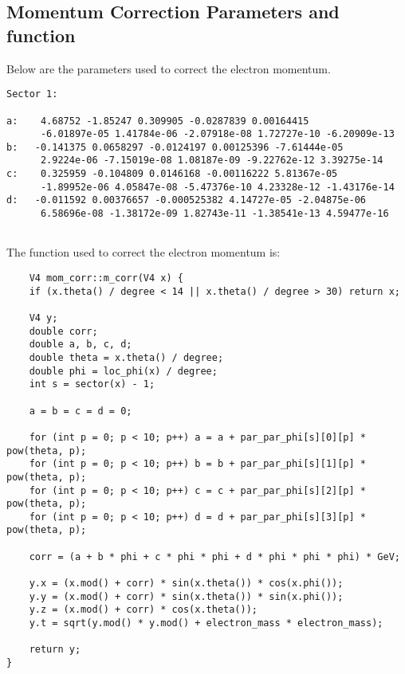 \subsection{Momentum Correction Parameters and function}\label{app:mom_corr_pars}

Below are the parameters used to correct the electron momentum.

\begin{verbatim}
Sector 1:

a:    4.68752 -1.85247 0.309905 -0.0287839 0.00164415
      -6.01897e-05 1.41784e-06 -2.07918e-08 1.72727e-10 -6.20909e-13
b:   -0.141375 0.0658297 -0.0124197 0.00125396 -7.61444e-05
      2.9224e-06 -7.15019e-08 1.08187e-09 -9.22762e-12 3.39275e-14
c:    0.325959 -0.104809 0.0146168 -0.00116222 5.81367e-05
      -1.89952e-06 4.05847e-08 -5.47376e-10 4.23328e-12 -1.43176e-14
d:   -0.011592 0.00376657 -0.000525382 4.14727e-05 -2.04875e-06
      6.58696e-08 -1.38172e-09 1.82743e-11 -1.38541e-13 4.59477e-16


\end{verbatim}


The function used to correct the electron momentum is:

\begin{verbatim}
    V4 mom_corr::m_corr(V4 x) {
    if (x.theta() / degree < 14 || x.theta() / degree > 30) return x;

    V4 y;
    double corr;
    double a, b, c, d;
    double theta = x.theta() / degree;
    double phi = loc_phi(x) / degree;
    int s = sector(x) - 1;

    a = b = c = d = 0;

    for (int p = 0; p < 10; p++) a = a + par_par_phi[s][0][p] * pow(theta, p);
    for (int p = 0; p < 10; p++) b = b + par_par_phi[s][1][p] * pow(theta, p);
    for (int p = 0; p < 10; p++) c = c + par_par_phi[s][2][p] * pow(theta, p);
    for (int p = 0; p < 10; p++) d = d + par_par_phi[s][3][p] * pow(theta, p);

    corr = (a + b * phi + c * phi * phi + d * phi * phi * phi) * GeV;

    y.x = (x.mod() + corr) * sin(x.theta()) * cos(x.phi());
    y.y = (x.mod() + corr) * sin(x.theta()) * sin(x.phi());
    y.z = (x.mod() + corr) * cos(x.theta());
    y.t = sqrt(y.mod() * y.mod() + electron_mass * electron_mass);

    return y;
}

\end{verbatim}